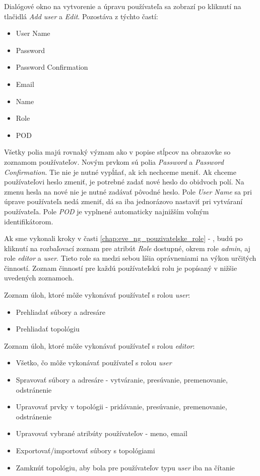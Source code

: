 Dialógové okno na vytvorenie a úpravu používateľa sa zobrazí po kliknutí na tlačidlá \emph{Add user} a \emph{Edit}. Pozostáva z týchto častí:

\begin{itemize}
    \item User Name
    \item Password
    \item Password Confirmation
    \item Email
    \item Name
    \item Role
    \item POD
\end{itemize}

Všetky polia majú rovnaký význam ako v popise stĺpcov na obrazovke so zoznamom používateľov. Novým prvkom sú polia \emph{Password} a \emph{Password Confirmation}. Tie nie je nutné vypĺňať, ak ich nechceme meniť. Ak chceme používateľovi heslo zmeniť, je potrebné zadať nové heslo do obidvoch polí. Na zmenu hesla na nové nie je nutné zadávať pôvodné heslo. Pole \emph{User Name} sa pri úprave používateľa nedá zmeniť, dá sa iba jednorázovo nastaviť pri vytváraní používateľa. Pole \emph{POD} je vyplnené automaticky najnižším voľným identifikátorom.

Ak sme vykonali kroky v časti \ref{chap:eve_ng_pouzivatelske_role} - , budú po kliknutí na rozbaľovací zoznam pre atribút \emph{Role} dostupné, okrem role \emph{admin}, aj role \emph{editor} a \emph{user}. Tieto role sa medzi sebou líšia oprávneniami na výkon určitých činností. Zoznam činností pre každú používateľskú rolu je popísaný v nižšie uvedených zoznamoch.

\noindent
Zoznam úloh, ktoré môže vykonávať používateľ s rolou \emph{user}:

\begin{itemize}
    \item Prehliadať súbory a adresáre
    \item Prehliadať topológiu
\end{itemize}

\noindent
Zoznam úloh, ktoré môže vykonávať používateľ s rolou \emph{editor}:

\begin{itemize}
    \item Všetko, čo môže vykonávať používateľ s rolou \emph{user}
    \item Spravovať súbory a adresáre - vytváranie, presúvanie, premenovanie, odstránenie
    \item Upravovať prvky v topológii - pridávanie, presúvanie, premenovanie, odstránenie
    \item Upravovať vybrané atribúty používateľov - meno, email
    \item Exportovať/importovať súbory s topológiami
    \item Zamknúť topológiu, aby bola pre používateľov typu \emph{user} iba na čítanie
\end{itemize}

